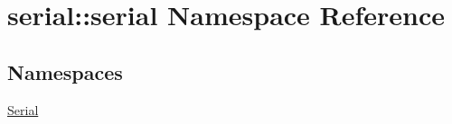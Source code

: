 \hypertarget{namespaceserial_1_1serial}{}\section{serial\+:\+:serial Namespace Reference}
\label{namespaceserial_1_1serial}
\subsection*{Namespaces}
\begin{DoxyCompactItemize}
\item 
 \mbox{\hyperlink{namespaceserial_1_1serial_1_1_serial}{Serial}}
\end{DoxyCompactItemize}
